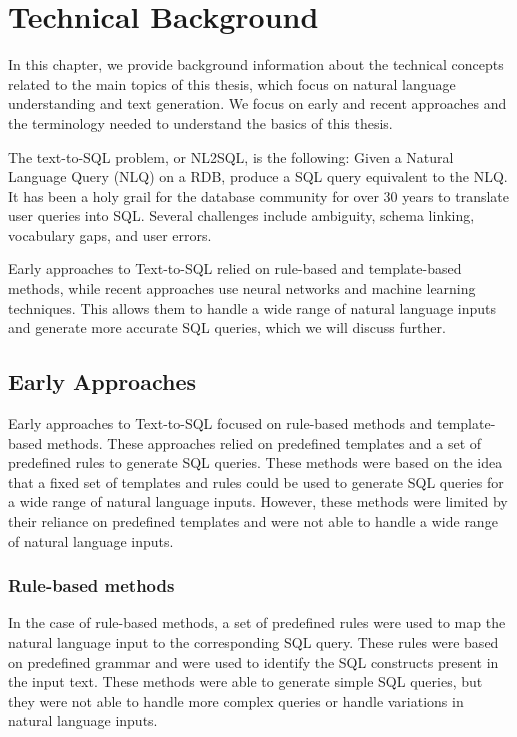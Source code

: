 \section{Technical Background}

In this chapter, we provide background information about the technical concepts related to the main topics of this thesis, which focus on natural language understanding and text generation. We focus on early and recent approaches and the terminology needed to understand the basics of this thesis.

The text-to-SQL problem, or \ac{NL2SQL}, is the following: Given a Natural Language Query (NLQ) on a \ac{RDB}, produce a SQL query equivalent to the \ac{NLQ}. It has been a holy grail for the database community for over 30 years to translate user queries into SQL. Several challenges include ambiguity, schema linking, vocabulary gaps, and user errors.

Early approaches to Text-to-SQL relied on rule-based and template-based methods, while recent approaches use neural networks and machine learning techniques. This allows them to handle a wide range of natural language inputs and generate more accurate SQL queries, which we will discuss further.

\subsection{Early Approaches}

Early approaches to Text-to-SQL focused on rule-based methods and template-based methods. These approaches relied on predefined templates and a set of predefined rules to generate SQL queries. These methods were based on the idea that a fixed set of templates and rules could be used to generate SQL queries for a wide range of natural language inputs. However, these methods were limited by their reliance on predefined templates and were not able to handle a wide range of natural language inputs.

\subsubsection{Rule-based methods}

In the case of rule-based methods, a set of predefined rules were used to map the natural language input to the corresponding SQL query. These rules were based on predefined grammar and were used to identify the SQL constructs present in the input text. These methods were able to generate simple SQL queries, but they were not able to handle more complex queries or handle variations in natural language inputs.

